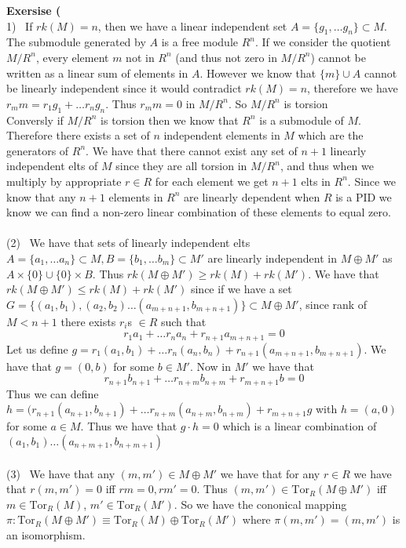 \documentclass[12pt]{article}
\newenvironment{ques}[1]{\textbf{Exersise #1}\vspace{1 mm}\\ }{\bigskip}
\theoremstyle{definition}
\newcommand{\Tor}{\text{Tor}}
\begin{document}
\begin{ques}{6.4}
	(1) \ If $rk(M) = n$, then we have a linear independent set $A = \{g_1,
	\dots g_n\} \subset M$. The submodule generated by $A$ is a free module
	$R^n$. If we consider the quotient $M/R^n$, every element $m$ not in $R^n$ (and
	thus not zero in $M/R^n$) cannot be written as a linear sum of elements in
	$A$. However we know that $\{m\} \cup A$ cannot be linearly independent
	since it would contradict $rk(M) = n$, therefore we have $r_mm = r_1g_1 +
	\dots r_ng_n$. Thus $r_mm = 0$ in $M/R^n$. So $M/R^n$ is torsion\\
	Conversly if $M/R^n$ is torsion then we know that $R^n$ is a submodule of
	$M$. Therefore there exists a set of $n$ independent elements in $M$ which
	are the generators of $R^n$. We have that there cannot exist any set of
	$n+1$ linearly independent elts of $M$ since they are all torsion in
	$M/R^n$, and thus when we multiply by appropriate $r \in R$ for each
	element we get $n+1$ elts in $R^n$. Since we know that any $n+1$ elements
	in $R^n$ are linearly dependent when $R$ is a PID we know we can find a
	non-zero linear combination of these elements to equal zero.\\
	\\
	(2) \ We have that sets of linearly independent elts $A = \{a_1, \dots
	a_n\} \subset M, B = \{b_1, \dots b_m\} \subset M'$ are linearly
	independent in $M \oplus M'$ as $A \times \{0\} \cup \{0\} \times B$. Thus
	$rk(M \oplus M') \geq rk(M) + rk(M')$. We have that $rk(M \oplus M') \leq
	rk(M) + rk(M')$ since if we have a set $G = \{(a_1,b_1), (a_2,b_2) \dots
	(a_{m+n+ 1}, b_{m + n + 1})\} \subset M \oplus M'$, since rank of $M < n +
	1$ there exists $r_i$s $\in R$ such that 
	$$ r_1a_1 + \dots r_na_n + r_{n+1}a_{m+n+1} = 0$$  
	Let us define $g =  r_1(a_1,b_1) + \dots r_n(a_n,b_n) +
	r_{n+1}(a_{m+n+1},b_{m+n+1})$. We have that $g = (0, b)$ for some $b \in M'$. Now
	in $M'$ we have that
	$$r_{n+1}b_{n+1} + \dots r_{n+m}b_{n+m} +
	r_{m+n+1}b = 0 $$
	Thus we can define $h = (r_{n+1}(a_{n+1},b_{n+1}) + \dots r_{n+m}(a_{n+m},
	b_{n+m}) + r_{m+n+1}g$ with $h = (a,0)$ for some $a \in M$. Thus we have
	that $g \cdot h = 0$ which is a linear combination of $(a_1,b_1) \dots
	(a_{n+m+1},b_{n+m+1})$\\
	\\
	(3) \ We have that any $(m,m') \in M \oplus M'$ we have that for any $r \in
	R$ we have that $r(m,m') = 0$ iff $rm = 0, rm' = 0$. Thus $(m,m') \in
	\Tor_R(M \oplus M')$ iff $m \in \Tor_R(M)$, $m' \in \Tor_R(M')$. So we have
	the cononical mapping $\pi: \Tor_R(M \oplus M') \equiv \Tor_R(M) \oplus
	\Tor_R(M')$ where $\pi(m,m') = (m,m')$ is an isomorphism.
\end{ques}
\end{document}

